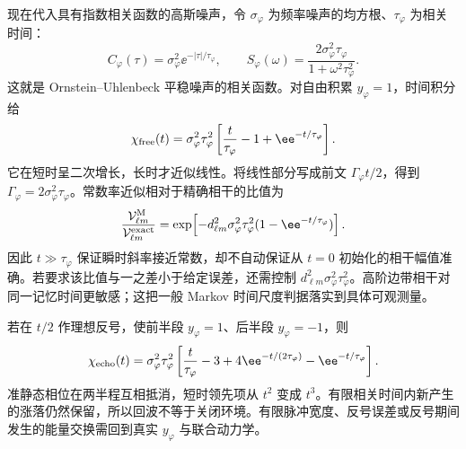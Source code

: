 现在代入具有指数相关函数的高斯噪声，令 $\sigma_\varphi$ 为频率噪声的均方根、$\tau_\varphi$ 为相关时间：
\begin{equation}
 C_\varphi(\tau)=\sigma_\varphi^2\ee^{-|\tau|/\tau_\varphi},\qquad
 S_\varphi(\omega)=\frac{2\sigma_\varphi^2\tau_\varphi}{1+\omega^2\tau_\varphi^2}.
 \label{eq:electron-exponential-noise}
\end{equation}
这就是 Ornstein--Uhlenbeck 平稳噪声的相关函数。对自由积累 $y_\varphi=1$，时间积分给
\begin{equation}
 \chi_{\rm free}(t)
 =\sigma_\varphi^2\tau_\varphi^2
 \left[\frac{t}{\tau_\varphi}-1+\ee^{-t/\tau_\varphi}\right].
 \label{eq:electron-exponential-dephasing}
\end{equation}
它在短时呈二次增长，长时才近似线性。将线性部分写成前文 $\Gamma_\varphi t/2$，得到 $\Gamma_\varphi=2\sigma_\varphi^2\tau_\varphi$。常数率近似相对于精确相干的比值为
\begin{equation}
 \frac{\mathcal V_{\ell m}^{\rm M}}{\mathcal V_{\ell m}^{\rm exact}}
 =\exp\!\left[-d_{\ell m}^2\sigma_\varphi^2\tau_\varphi^2
 (1-\ee^{-t/\tau_\varphi})\right].
 \label{eq:electron-markov-visibility-error}
\end{equation}
因此 $t\gg\tau_\varphi$ 保证瞬时斜率接近常数，却不自动保证从 $t=0$ 初始化的相干幅值准确。若要求该比值与一之差小于给定误差，还需控制 $d_{\ell m}^2\sigma_\varphi^2\tau_\varphi^2$。高阶边带相干对同一记忆时间更敏感；这把一般 Markov 时间尺度判据落实到具体可观测量。

若在 $t/2$ 作理想反号，使前半段 $y_\varphi=1$、后半段 $y_\varphi=-1$，则
\begin{equation}
 \chi_{\rm echo}(t)=\sigma_\varphi^2\tau_\varphi^2
 \left[\frac{t}{\tau_\varphi}-3
 +4\ee^{-t/(2\tau_\varphi)}-\ee^{-t/\tau_\varphi}\right].
 \label{eq:electron-exponential-echo}
\end{equation}
准静态相位在两半程互相抵消，短时领先项从 $t^2$ 变成 $t^3$。有限相关时间内新产生的涨落仍然保留，所以回波不等于关闭环境。有限脉冲宽度、反号误差或反号期间发生的能量交换需回到真实 $y_\varphi$ 与联合动力学。

